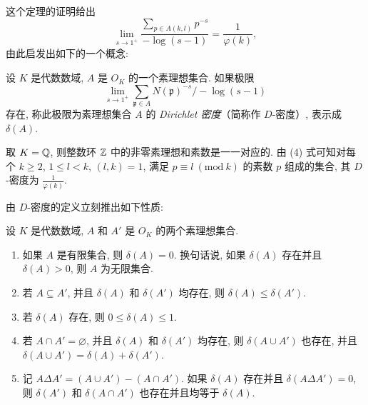 这个定理的证明给出
\begin{equation}  \lim\limits_{s\to1^+}\frac{\sum\limits_{p\in A(k,l)}p^{-s}}{-\log(s-1)}=\frac{1}{\varphi(k)},\tag{4}\end{equation}
由此启发出如下的一个概念: 

\begin{definition}\label{def:ch5-1}
设 $K$ 是代数数域, $A$ 是 $O_K$ 的一个素理想集合. 如果极限
\[
  \lim\limits_{s\to1^+}\sum\limits_{\mathfrak{p}\in A}N(\mathfrak{p})^{-s}\big/-\log(s-1)
\]
存在, 称此极限为素理想集合 $A$ 的 \emph{Dirichlet 密度}（简称作 $D$-密度）, 表示成 $\delta(A)$. 
\end{definition}

\begin{example}
取 $K=\mathbb{Q}$, 则整数环 $\mathbb{Z}$ 中的非零素理想和素数是一一对应的. 由 (4) 式可知对每个 $k\geqslant 2$, $1\leqslant l<k$, $(l,k)=1$, 满足 $p\equiv l\ (\mathrm{mod}\ k)$ 的素数 $p$ 组成的集合, 其 $D$-密度为 $\frac{1}{\varphi(k)}$. 
\end{example}

由 $D$-密度的定义立刻推出如下性质: 

\begin{lemma}\label{lem:ch5-1}
设 $K$ 是代数数域, $A$ 和 $A'$ 是 $O_K$ 的两个素理想集合. 
\begin{enumerate}[(1)]
  \item 如果 $A$ 是有限集合, 则 $\delta(A)=0$. 换句话说, 如果 $\delta(A)$ 存在并且 $\delta(A)>0$, 则 $A$ 为无限集合. 
  \item 若 $A\subseteq A'$, 并且 $\delta(A)$ 和 $\delta(A')$ 均存在, 则 $\delta(A)\leqslant\delta(A')$. 
  \item 若 $\delta(A)$ 存在, 则 $0\leqslant\delta(A)\leqslant 1$. 
  \item 若 $A\cap A'=\varnothing$, 并且 $\delta(A)$ 和 $\delta(A')$ 均存在, 则 $\delta(A\cup A')$ 也存在, 并且 $\delta(A\cup A')=\delta(A)+\delta(A')$. 
  \item 记 $A\Delta A'=(A\cup A')-(A\cap A')$. 如果 $\delta(A)$ 存在并且 $\delta(A\Delta A')=0$, 则 $\delta(A')$ 和 $\delta(A\cap A')$ 也存在并且均等于 $\delta(A)$. 
\end{enumerate}
\end{lemma}

